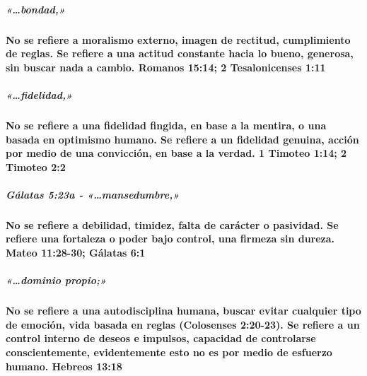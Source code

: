 \documentclass[11a pt,twoside]{article}
\newcommand{\scripture}[1]{%
  {\fontsize{12pt}{16pt}\selectfont\ScriptureFont\itshape #1}%
}
\let\oldparagraph\paragraph
\renewcommand{\paragraph}{\needspace{3\baselineskip}\oldparagraph}
\let\oldsubparagraph\subparagraph
\renewcommand{\subparagraph}{\needspace{2\baselineskip}\oldsubparagraph}
\begin{document}
\subparagraph{\texorpdfstring{\scripture{«…bondad,»}}{}}\label{bondad}

\paragraph{No se refiere a moralismo externo, imagen de rectitud,
cumplimiento de reglas. Se refiere a una actitud constante hacia lo
bueno, generosa, sin buscar nada a cambio. Romanos 15:14; 2
Tesalonicenses
1:11}\label{no-se-refiere-a-moralismo-externo-imagen-de-rectitud-cumplimiento-de-reglas.-se-refiere-a-una-actitud-constante-hacia-lo-bueno-generosa-sin-buscar-nada-a-cambio.-romanos-1514-2-tesalonicenses-111}

\subparagraph{\texorpdfstring{\scripture{«…fidelidad,»}}{}}\label{fidelidad}

\paragraph{No se refiere a una fidelidad fingida, en base a la mentira,
o una basada en optimismo humano. Se refiere a un fidelidad genuina,
acción por medio de una convicción, en base a la verdad. 1 Timoteo 1:14;
2 Timoteo
2:2}\label{no-se-refiere-a-una-fidelidad-fingida-en-base-a-la-mentira-o-una-basada-en-optimismo-humano.-se-refiere-a-un-fidelidad-genuina-acciuxf3n-por-medio-de-una-convicciuxf3n-en-base-a-la-verdad.-1-timoteo-114-2-timoteo-22}

\subparagraph{\texorpdfstring{Gálatas 5:23a -
\scripture{«…mansedumbre,»}}{Gálatas 5:23a - }}\label{guxe1latas-523a---mansedumbre}

\paragraph{No se refiere a debilidad, timidez, falta de carácter o
pasividad. Se refiere una fortaleza o poder bajo control, una firmeza
sin dureza. Mateo 11:28-30; Gálatas
6:1}\label{no-se-refiere-a-debilidad-timidez-falta-de-caruxe1cter-o-pasividad.-se-refiere-una-fortaleza-o-poder-bajo-control-una-firmeza-sin-dureza.-mateo-1128-30-guxe1latas-61}

\subparagraph{\texorpdfstring{\scripture{«…dominio propio;»}}{}}\label{dominio-propio}

\paragraph{No se refiere a una autodisciplina humana, buscar evitar
cualquier tipo de emoción, vida basada en reglas (Colosenses 2:20-23).
Se refiere a un control interno de deseos e impulsos, capacidad de
controlarse conscientemente, evidentemente esto no es por medio de
esfuerzo humano. Hebreos
13:18}\label{no-se-refiere-a-una-autodisciplina-humana-buscar-evitar-cualquier-tipo-de-emociuxf3n-vida-basada-en-reglas-colosenses-220-23.-se-refiere-a-un-control-interno-de-deseos-e-impulsos-capacidad-de-controlarse-conscientemente-evidentemente-esto-no-es-por-medio-de-esfuerzo-humano.-hebreos-1318}
\end{document}
